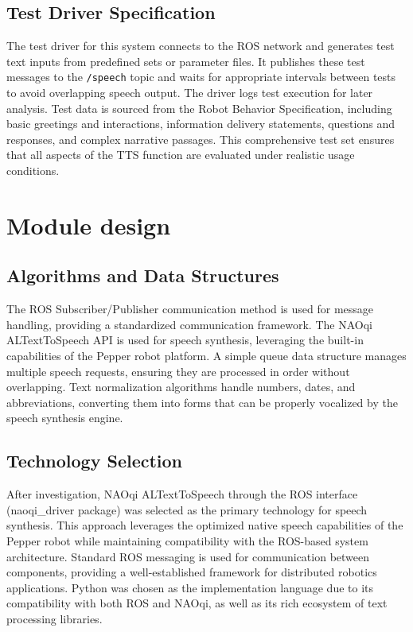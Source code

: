 \documentclass{CSSRforAfrica}
\begin{document}
\subsection{Test Driver Specification}
The test driver for this system connects to the ROS network and generates test text inputs from predefined sets or parameter files. It publishes these test messages to the \texttt{/speech} topic and waits for appropriate intervals between tests to avoid overlapping speech output. The driver logs test execution for later analysis.
Test data is sourced from the Robot Behavior Specification, including basic greetings and interactions, information delivery statements, questions and responses, and complex narrative passages. This comprehensive test set ensures that all aspects of the TTS function are evaluated under realistic usage conditions.


\newpage
\section{Module design}

\subsection{Algorithms and Data Structures}

 The ROS Subscriber/Publisher communication method is used for message handling, providing a standardized communication framework. The NAOqi ALTextToSpeech API is used for speech synthesis, leveraging the built-in capabilities of the Pepper robot platform.
A simple queue data structure manages multiple speech requests, ensuring they are processed in order without overlapping. Text normalization algorithms handle numbers, dates, and abbreviations, converting them into forms that can be properly vocalized by the speech synthesis engine.


\subsection{Technology Selection}

After investigation, NAOqi ALTextToSpeech through the ROS interface (naoqi\_driver package) was selected as the primary technology for speech synthesis. This approach leverages the optimized native speech capabilities of the Pepper robot while maintaining compatibility with the ROS-based system architecture.
Standard ROS messaging is used for communication between components, providing a well-established framework for distributed robotics applications. Python was chosen as the implementation language due to its compatibility with both ROS and NAOqi, as well as its rich ecosystem of text processing libraries.
\end{document}
